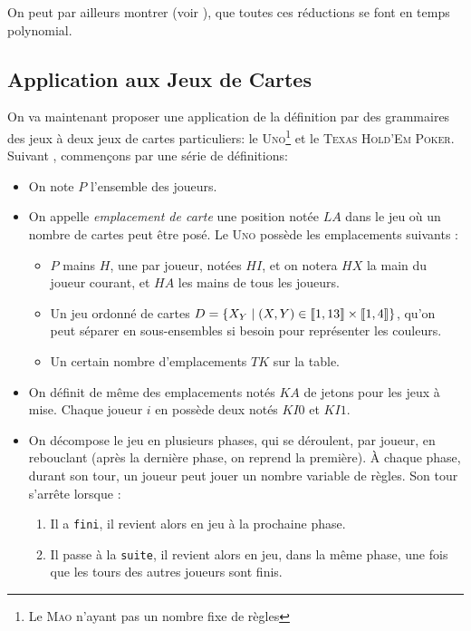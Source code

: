 \documentclass{cours}
\begin{document}
On peut par ailleurs montrer (voir \cite{cfgames}), que toutes ces réductions se font en temps polynomial. 

\subsection{Application aux Jeux de Cartes}
On va maintenant proposer une application de la définition par des grammaires des jeux à deux jeux de cartes particuliers: le \textsc{Uno}\footnote{Le \textsc{Mao} n'ayant pas un nombre fixe de règles} et le \textsc{Texas Hold'Em Poker}. Suivant \cite{card-game-lang}, commençons par une série de définitions: 
\begin{definition}
    \begin{itemize}
        \item On note $P$ l'ensemble des joueurs.
        \item On appelle \emph{emplacement de carte} une position notée $LA$ dans le jeu où un nombre de cartes peut être posé. Le \textsc{Uno} possède les emplacements suivants : 
        \begin{itemize}
            \item $P$ mains $H$, une par joueur, notées $HI$, et on notera $HX$ la main du joueur courant, et $HA$ les mains de tous les joueurs. 
            \item Un jeu ordonné de cartes $D = \left\{X_{Y} \mid \left(X, Y\right)\in \left\llbracket 1, 13\right\rrbracket \times \left\llbracket 1, 4\right\rrbracket\right\}$, qu'on peut séparer en sous-ensembles si besoin pour représenter les couleurs.
            \item Un certain nombre d'emplacements $TK$ sur la table. 
        \end{itemize}
        \item On définit de même des emplacements notés $KA$ de jetons pour les jeux à mise. Chaque joueur $i$ en possède deux notés $KI0$ et $KI1$. 
        \item On décompose le jeu en plusieurs phases, qui se déroulent, par joueur, en rebouclant (après la dernière phase, on reprend la première). À chaque phase, durant son tour, un joueur peut jouer un nombre variable de règles. Son tour s'arrête lorsque : 
        \begin{enumerate}
            \item Il a \texttt{fini}, il revient alors en jeu à la prochaine phase.
            \item Il passe à la \texttt{suite}, il revient alors en jeu, dans la même phase, une fois que les tours des autres joueurs sont finis. 

\end{enumerate}
\end{itemize}
\end{definition}
\end{document}
